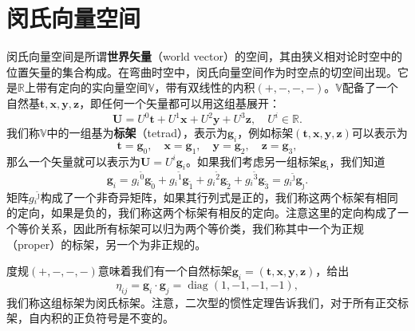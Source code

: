 \section{闵氏向量空间}

闵氏向量空间是所谓\textbf{世界矢量}（world vector）的空间，其由狭义相对论时空中的位置矢量的集合构成。在弯曲时空中，闵氏向量空间作为时空点的切空间出现。它是$\mathbb{R}$上带有定向的实向量空间$\mathbb{V}$，带有双线性的内积$( +,-,-,-)$。$\mathbb{V}$配备了一个自然基$\boldsymbol{t} ,\boldsymbol{x} ,\boldsymbol{y} ,\boldsymbol{z}$，即任何一个矢量都可以用这组基展开：
\begin{equation*}
	\boldsymbol{U} =U^{0}\boldsymbol{t} +U^{1}\boldsymbol{x} +U^{2}\boldsymbol{y} +U^{3}\boldsymbol{z} ,\quad U^{i} \in \mathbb{R} .
\end{equation*}
我们称$\mathbb{V}$中的一组基为\textbf{标架}（tetrad），表示为$\boldsymbol{g}_{i}$，例如标架$(\boldsymbol{t} ,\boldsymbol{x} ,\boldsymbol{y} ,\boldsymbol{z})$可以表示为
\begin{equation*}
	\boldsymbol{t} =\boldsymbol{g}_{0} ,\quad \boldsymbol{x} =\boldsymbol{g}_{1} ,\quad \boldsymbol{y} =\boldsymbol{g}_{2} ,\quad \boldsymbol{z} =\boldsymbol{g}_{3} ,
\end{equation*}
那么一个矢量就可以表示为$\boldsymbol{U} =U^{i}\boldsymbol{g}_{i}$。如果我们考虑另一组标架$\boldsymbol{g}_{\tilde{\imath }}$，我们知道
\begin{equation*}
	\boldsymbol{g}_{i} =g{_{i}}^{\tilde{0}}\boldsymbol{g}_{\tilde{0}} +g{_{i}}^{\tilde{1}}\boldsymbol{g}_{\tilde{1}} +g{_{i}}^{\tilde{2}}\boldsymbol{g}_{\tilde{2}} +g{_{i}}^{\tilde{3}}\boldsymbol{g}_{\tilde{3}} =g{_{i}}^{\tilde{\jmath }}\boldsymbol{g}_{\hat{\jmath }} .
\end{equation*}
矩阵$g{_{i}}^{\tilde{\jmath }}$构成了一个非奇异矩阵，如果其行列式是正的，我们称这两个标架有相同的定向，如果是负的，我们称这两个标架有相反的定向。注意这里的定向构成了一个等价关系，因此所有标架可以归为两个等价类，我们称其中一个为正规（proper）的标架，另一个为非正规的。



度规$( +,-,-,-)$意味着我们有一个自然标架$\boldsymbol{g}_{i} =(\boldsymbol{t} ,\boldsymbol{x} ,\boldsymbol{y} ,\boldsymbol{z})$，给出
\begin{equation*}
	\eta _{ij} =\boldsymbol{g}_{i} \cdot \boldsymbol{g}_{j} =\operatorname{diag}( 1,-1,-1,-1) ,
\end{equation*}
我们称这组标架为闵氏标架。注意，二次型的惯性定理告诉我们，对于所有正交标架，自内积的正负符号是不变的。



